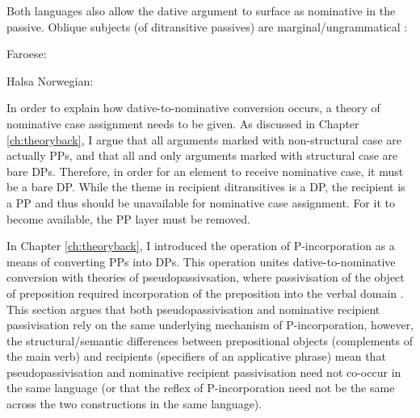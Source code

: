Both languages also allow the dative argument to surface as nominative in the passive. Oblique subjects (of ditransitive passives) are marginal/ungrammatical \citep{Eyorsson.2012}:

\begin{exe}
	\ex Faroese:\label{ex:far-pass}
	\begin{xlist}
	\end{xlist}
	\ex Halsa Norwegian:\label{ex:halsa-pass}
	\begin{xlist}
	\end{xlist}
\end{exe}

In order to explain how dative-to-nominative conversion occurs, a theory of nominative case assignment needs to be given. As discussed in Chapter \ref{ch:theoryback}, I argue that all arguments marked with non-structural case are actually PPs, and that all and only arguments marked with structural case are bare DPs. Therefore, in order for an element to receive nominative case, it must be a bare DP. While the theme in recipient ditransitives is a DP, the recipient is a PP and thus should be unavailable for nominative case assignment. For it to become available, the PP layer must be removed.

In Chapter \ref{ch:theoryback}, I introduced the operation of P-incorporation as a means of converting PPs into DPs. This operation unites dative-to-nominative conversion with theories of pseudopassivsation, where passivisation of the object of preposition required incorporation of the preposition into the verbal domain \citep{Herslund.1984}. This section argues that both pseudopassivisation and nominative recipient passivisation rely on the same underlying mechanism of P-incorporation, however, the structural/semantic differences between prepositional objects (complements of the main verb) and recipients (specifiers of an applicative phrase) mean that pseudopassivisation and nominative recipient passivisation need not co-occur in the same language (or that the reflex of P-incorporation need not be the same across the two constructions in the same language).

